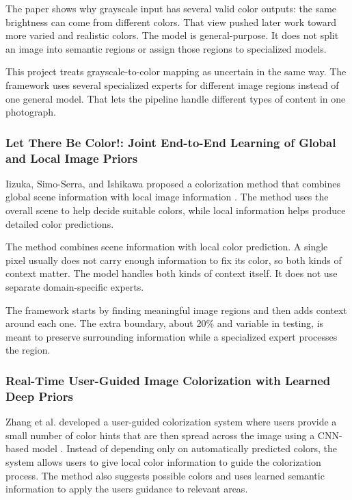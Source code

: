 \documentclass{FastFyp}
\begin{document}
The paper shows why grayscale input has several valid color outputs: the same brightness can come from different colors. That view pushed later work toward more varied and realistic colors. The model is general-purpose. It does not split an image into semantic regions or assign those regions to specialized models.

This project treats grayscale-to-color mapping as uncertain in the same way. The framework uses several specialized experts for different image regions instead of one general model. That lets the pipeline handle different types of content in one photograph.

\subsubsection{Let There Be Color!: Joint End-to-End Learning of Global and Local Image Priors}

Iizuka, Simo-Serra, and Ishikawa proposed a colorization method that combines global scene information with local image information \cite{ref2}. The method uses the overall scene to help decide suitable colors, while local information helps produce detailed color predictions.

The method combines scene information with local color prediction. A single pixel usually does not carry enough information to fix its color, so both kinds of context matter. The model handles both kinds of context itself. It does not use separate domain-specific experts.

The framework starts by finding meaningful image regions and then adds context around each one. The extra boundary, about 20\% and variable in testing, is meant to preserve surrounding information while a specialized expert processes the region.

\subsubsection{Real-Time User-Guided Image Colorization with Learned Deep Priors}

Zhang et al. developed a user-guided colorization system where users provide a small number of color hints that are then spread across the image using a CNN-based model \cite{ref3}. Instead of depending only on automatically predicted colors, the system allows users to give local color information to guide the colorization process. The method also suggests possible colors and uses learned semantic information to apply the user\textquotesingle s guidance to relevant areas.
\end{document}
